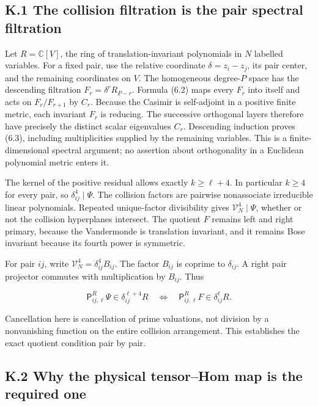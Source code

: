\hypertarget{k.1-the-collision-filtration-is-the-pair-spectral-filtration}{%
\subsection{K.1 The collision filtration is the pair spectral filtration}\label{k.1-the-collision-filtration-is-the-pair-spectral-filtration}}

Let \(R=\mathbb C[V]\), the ring of translation-invariant polynomials in \(N\) labelled variables. For a fixed pair, use the relative coordinate \(\delta=z_i-z_j\), its pair center, and the remaining coordinates on \(V\). The homogeneous degree-\(P\) space has the descending filtration \(F_r=\delta^rR_{P-r}\). Formula (6.2) maps every \(F_r\) into itself and acts on \(F_r/F_{r+1}\) by \(C_r\). Because the Casimir is self-adjoint in a positive finite metric, each invariant \(F_r\) is reducing. The successive orthogonal layers therefore have precisely the distinct scalar eigenvalues \(C_r\). Descending induction proves (6.3), including multiplicities supplied by the remaining variables. This is a finite-dimensional spectral argument; no assertion about orthogonality in a Euclidean polynomial metric enters it.

The kernel of the positive residual allows exactly \(k\ge\ell+4\). In particular \(k\ge4\) for every pair, so \(\delta_{ij}^4\mid\Psi\). The collision factors are pairwise nonassociate irreducible linear polynomials. Repeated unique-factor divisibility gives \(\mathcal V_N^4\mid\Psi\), whether or not the collision hyperplanes intersect. The quotient \(F\) remains left and right primary, because the Vandermonde is translation invariant, and it remains Bose invariant because its fourth power is symmetric.

For pair \(ij\), write \(\mathcal V_N^4=\delta_{ij}^4B_{ij}\). The factor \(B_{ij}\) is coprime to \(\delta_{ij}\). A right pair projector commutes with multiplication by \(B_{ij}\). Thus

\[
\mathsf P^R_{ij,\ell}\Psi\in\delta_{ij}^{\ell+4}R
\quad\Longleftrightarrow\quad
\mathsf P^R_{ij,\ell}F\in\delta_{ij}^{\ell}R.
\tag{K.1}
\]

Cancellation here is cancellation of prime valuations, not division by a nonvanishing function on the entire collision arrangement. This establishes the exact quotient condition pair by pair.

\hypertarget{k.2-why-the-physical-tensorhom-map-is-the-required-one}{%
\subsection{K.2 Why the physical tensor--Hom map is the required one}\label{k.2-why-the-physical-tensorhom-map-is-the-required-one}}

